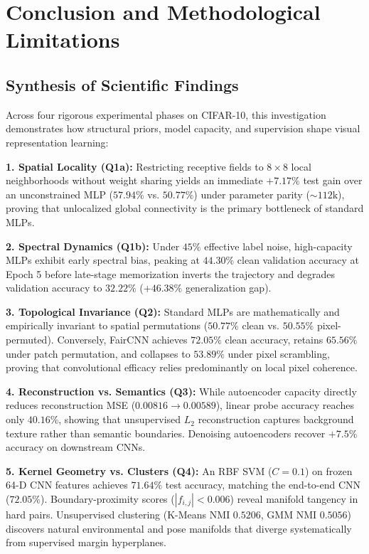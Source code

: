 \section{Conclusion and Methodological Limitations}
\label{sec:conclusion}

\subsection{Synthesis of Scientific Findings}
Across four rigorous experimental phases on CIFAR-10, this investigation demonstrates how structural priors, model capacity, and supervision shape visual representation learning:

\noindent\textbf{1. Spatial Locality (Q1a):} Restricting receptive fields to $8 \times 8$ local neighborhoods without weight sharing yields an immediate $+7.17\%$ test gain over an unconstrained MLP ($57.94\%$ vs. $50.77\%$) under parameter parity ($\sim 112\text{k}$), proving that unlocalized global connectivity is the primary bottleneck of standard MLPs.

\noindent\textbf{2. Spectral Dynamics (Q1b):} Under $45\%$ effective label noise, high-capacity MLPs exhibit early spectral bias, peaking at $44.30\%$ clean validation accuracy at Epoch 5 before late-stage memorization inverts the trajectory and degrades validation accuracy to $32.22\%$ ($+46.38\%$ generalization gap).

\noindent\textbf{3. Topological Invariance (Q2):} Standard MLPs are mathematically and empirically invariant to spatial permutations ($50.77\%$ clean vs. $50.55\%$ pixel-permuted). Conversely, FairCNN achieves $72.05\%$ clean accuracy, retains $65.56\%$ under patch permutation, and collapses to $53.89\%$ under pixel scrambling, proving that convolutional efficacy relies predominantly on local pixel coherence.

\noindent\textbf{4. Reconstruction vs. Semantics (Q3):} While autoencoder capacity directly reduces reconstruction MSE ($0.00816 \to 0.00589$), linear probe accuracy reaches only $40.16\%$, showing that unsupervised $L_2$ reconstruction captures background texture rather than semantic boundaries. Denoising autoencoders recover $+7.5\%$ accuracy on downstream CNNs.

\noindent\textbf{5. Kernel Geometry vs. Clusters (Q4):} An RBF SVM ($C=0.1$) on frozen 64-D CNN features achieves $71.64\%$ test accuracy, matching the end-to-end CNN ($72.05\%$). Boundary-proximity scores ($|f_{i,j}| < 0.006$) reveal manifold tangency in hard pairs. Unsupervised clustering (K-Means NMI $0.5206$, GMM NMI $0.5056$) discovers natural environmental and pose manifolds that diverge systematically from supervised margin hyperplanes.

